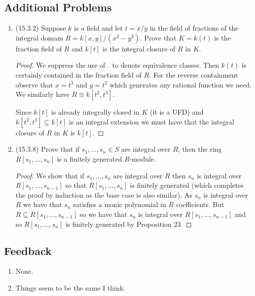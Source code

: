 \documentclass[11pt]{article}
\begin{document}
\subsection*{Additional Problems}
\begin{enumerate}
    \item (15.3.2) Suppose $k$ is a field and let $t = \overline{x}/\overline{y}$ in the field of fractions of the integral domain $R = k[x,y]/(x^2-y^3)$. Prove that $K = k(t)$ is the fraction field of $R$ and $k[t]$ is the integral closure of $R$ in $K$. \begin{proof}
        We suppress the use of $\overline{~}$ to denote equivalence classes. Then $k(t)$ is certainly contained in the fraction field of $R$. For the reverse containment observe that $x=t^3$ and $y = t^2$ which generates any rational function we need. We similarly have $R\cong k[t^2,t^3]$.

        Since $k[t]$ is already integrally closed in $K$ (it is a UFD) and $k[t^2,t^3]\subseteq k[t]$ is an integral extension we must have that the integral closure of $R$ in $K$ is $k[t]$.
    \end{proof}
    \item (15.3.8) Prove that if $s_1,\dots,s_n\in S$ are integral over $R$, then the ring $R[s_1,\dots,s_n]$ is a finitely generated $R$-module. \begin{proof}
        We show that if $s_1,\dots,s_n$ are integral over $R$ then $s_n$ is integral over $R[s_1,\dots,s_{n-1}]$ so that $R[s_1,\dots,s_n]$ is finitely generated (which completes the proof by induction as the base case is also similar). As $s_n$ is integral over $R$ we have that $s_n$ satisfies a monic polynomial in $R$ coefficients. But $R\subseteq R[s_1,\dots,s_{n-1}]$ so we have that $s_n$ is integral over $R[s_1,\dots,s_{n-1}]$ and so $R[s_1,\dots,s_n]$ is finitely generated by Proposition 23.
    \end{proof}
\end{enumerate}
\subsection*{Feedback}
\begin{enumerate}
    \item None.
    \item Things seem to be the same I think.
\end{enumerate}
\end{document}
